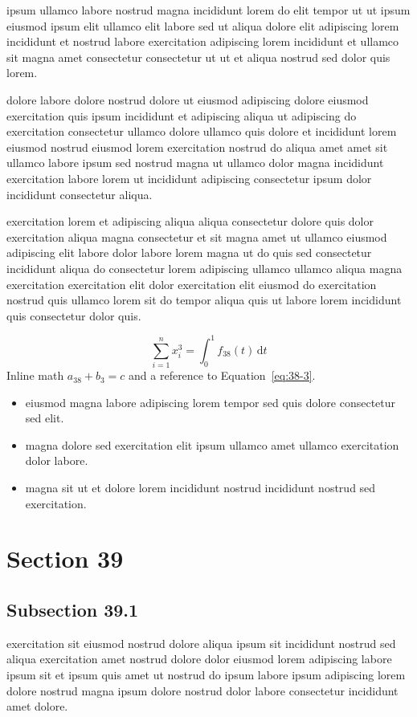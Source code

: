 \documentclass{article}
\begin{document}
ipsum ullamco labore nostrud magna incididunt lorem do elit tempor ut ut ipsum eiusmod ipsum elit ullamco elit labore sed ut aliqua dolore elit adipiscing lorem incididunt et nostrud labore exercitation adipiscing lorem incididunt et ullamco sit magna amet consectetur consectetur ut ut et aliqua nostrud sed dolor quis lorem.

dolore labore dolore nostrud dolore ut eiusmod adipiscing dolore eiusmod exercitation quis ipsum incididunt et adipiscing aliqua ut adipiscing do exercitation consectetur ullamco dolore ullamco quis dolore et incididunt lorem eiusmod nostrud eiusmod lorem exercitation nostrud do aliqua amet amet sit ullamco labore ipsum sed nostrud magna ut ullamco dolor magna incididunt exercitation labore lorem ut incididunt adipiscing consectetur ipsum dolor incididunt consectetur aliqua.

exercitation lorem et adipiscing aliqua aliqua consectetur dolore quis dolor exercitation aliqua magna consectetur et sit magna amet ut ullamco eiusmod adipiscing elit labore dolor labore lorem magna ut do quis sed consectetur incididunt aliqua do consectetur lorem adipiscing ullamco ullamco aliqua magna exercitation exercitation elit dolor exercitation elit eiusmod do exercitation nostrud quis ullamco lorem sit do tempor aliqua quis ut labore lorem incididunt quis consectetur dolor quis.

\begin{equation}\label{eq:38-3}
  \sum_{i=1}^{n} x_i^{3} = \int_0^1 f_{38}(t)\,\mathrm{d}t
\end{equation}
Inline math $a_{38} + b_{3} = c$ and a reference to Equation~\eqref{eq:38-3}.

\begin{itemize}
  \item eiusmod magna labore adipiscing lorem tempor sed quis dolore consectetur sed elit.
  \item magna dolore sed exercitation elit ipsum ullamco amet ullamco exercitation dolor labore.
  \item magna sit ut et dolore lorem incididunt nostrud incididunt nostrud sed exercitation.
\end{itemize}

\section{Section 39}\label{sec:39}
\subsection{Subsection 39.1}\label{sec:39-1}
exercitation sit eiusmod nostrud dolore aliqua ipsum sit incididunt nostrud sed aliqua exercitation amet nostrud dolore dolor eiusmod lorem adipiscing labore ipsum sit et ipsum quis amet ut nostrud do ipsum labore ipsum adipiscing lorem dolore nostrud magna ipsum dolore nostrud dolor labore consectetur incididunt amet dolore.
\end{document}
